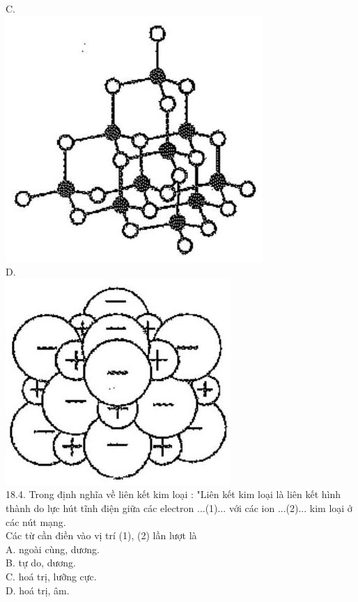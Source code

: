 \documentclass[10pt]{article}
\begin{document}
C.\\
\includegraphics[max width=\textwidth, center]{2025_10_23_74efce88ce3a451fd6b0g-059}\\
D.\\
\includegraphics[max width=\textwidth, center]{2025_10_23_74efce88ce3a451fd6b0g-059(1)}\\
18.4. Trong định nghĩa về liên kết kim loại : "Liên kết kim loại là liên kết hình thành do lực hút tĩnh điện giữa các electron ...(1)... với các ion ...(2)... kim loại ở các nút mạng.\\
Các từ cần điền vào vị trí (1), (2) lần lượt là\\
A. ngoài cùng, dương.\\
B. tự do, dương.\\
C. hoá trị, lưỡng cực.\\
D. hoá trị, âm.
\end{document}
